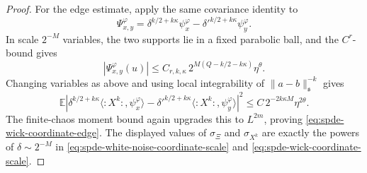 \begin{proof}
For the edge estimate, apply the same covariance identity to
\[
  \Psi_{x,y}^\varphi
  =
  \delta^{k/2+k\kappa}\psi_x^\varphi
  -
  {\delta'}^{k/2+k\kappa}\psi_y^\varphi .
\]
In scale \(2^{-M}\) variables, the two supports lie in a fixed parabolic ball,
and the \(C^r\)-bound gives
\begin{equation}
  |\Psi_{x,y}^\varphi(u)|
  \leq
  C_{r,k,\kappa}\,2^{M(Q-k/2-k\kappa)}\eta^\theta .
  \label{eq:spde-wick-edge-test-difference}
\end{equation}
Changing variables as above and using local integrability of
\(\|a-b\|_{\mathfrak s}^{-k}\) gives
\[
  \mathbb E
  \left|
    \delta^{k/2+k\kappa}\langle :X^k:,\psi_x^\varphi\rangle
    -
    {\delta'}^{k/2+k\kappa}\langle :X^k:,\psi_y^\varphi\rangle
  \right|^2
  \leq
  C\,2^{-2k\kappa M}\eta^{2\theta}.
\]
The finite-chaos moment bound again upgrades this to \(L^{2m}\), proving
\eqref{eq:spde-wick-coordinate-edge}.  The displayed values of
\(\sigma_\Xi\) and \(\sigma_{X^k}\) are exactly the powers of
\(\delta\sim2^{-M}\) in
\eqref{eq:spde-white-noise-coordinate-scale} and
\eqref{eq:spde-wick-coordinate-scale}.
\end{proof}

